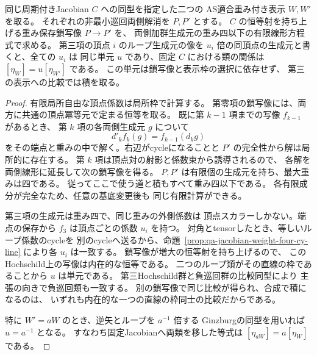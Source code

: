 \begin{corollary}[負巡回類の比較単元の有限計算]
\label{cor:qa-jacobian-weight-four-cy-ratio}
同じ周期付きJacobian $C$ への同型を指定した二つの
AS適合重み付き表示 $W,W'$ を取る。
それぞれの非最小巡回両側解消を $P,P'$ とする。
$C$ の恒等射を持ち上げる重み保存鎖写像 $P\to P'$ を、
両側加群生成元の重み四以下の有限線形方程式で求める。
第三項の頂点 $i$ のループ生成元の像を
$u_i$ 倍の同頂点の生成元と書くと、全ての $u_i$ は
同じ単元 $u$ であり、固定 $C$ における類の関係は
$[\eta_W]=u[\eta_{W'}]$ である。
この単元は鎖写像と表示枠の選択に依存せず、
第三の表示への比較では積を取る。
\end{corollary}
\begin{proof}
有限局所自由な頂点係数は局所枠で計算する。
第零項の鎖写像には、両方に共通の頂点冪等元で定まる恒等を取る。
既に第 $k-1$ 項までの写像 $f_{k-1}$ があるとき、
第 $k$ 項の各両側生成元 $g$ について
\[
 d'_k f_k(g)=f_{k-1}(d_k g)
\]
をその端点と重みの中で解く。右辺がcycleになることと
$P'$ の完全性から解は局所的に存在する。
第 $k$ 項は頂点対の射影と係数束から誘導されるので、
各解を両側線形に延長して次の鎖写像を得る。
$P,P'$ は有限個の生成元を持ち、最大重みは四である。
従ってここで使う道と積もすべて重み四以下である。
各有限成分が完全なため、任意の基底変更後も
同じ有限計算ができる。

第三項の生成元は重み四で、同じ重みの外側係数は
頂点スカラーしかない。端点の保存から
$f_3$ は頂点ごとの係数 $u_i$ を持つ。
対角とtensorしたとき、等しいループ係数のcycleを
別のcycleへ送るから、命題~\ref{prop:qa-jacobian-weight-four-cy-line}
により各 $u_i$ は一致する。
鎖写像が増大の恒等射を持ち上げるので、
このHochschild上の写像は内在的な恒等である。
二つのループ類がその直線の枠であることから $u$ は単元である。
第三Hochschild群と負巡回群の比較同型により
主張の向きで負巡回類も一致する。
別の鎖写像で同じ比較が得られ、合成で積になるのは、
いずれも内在的な一つの直線の枠同士の比較だからである。

特に $W'=aW$ のとき、逆矢とループを $a^{-1}$ 倍する
Ginzburgの同型を用いれば $u=a^{-1}$ となる。
すなわち固定Jacobianへ両類を移した等式は
$[\eta_{aW}]=a[\eta_W]$ である。
\end{proof}

